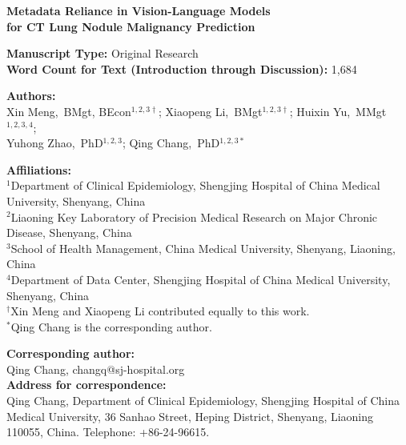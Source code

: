 \documentclass[11pt]{article}
\begin{document}
\doublespacing

\begin{center}
{\LARGE\bfseries Metadata Reliance in Vision-Language Models\\
for CT Lung Nodule Malignancy Prediction\par}
\end{center}
\vspace{0.75em}

\noindent\textbf{Manuscript Type:} Original Research\\
\textbf{Word Count for Text (Introduction through Discussion):} 1,684

\vspace{0.75em}

\noindent\textbf{Authors:}\\
Xin Meng,~BMgt, BEcon$^{1,2,3\dagger}$;
Xiaopeng Li,~BMgt$^{1,2,3\dagger}$;
Huixin Yu,~MMgt$^{1,2,3,4}$;\\
Yuhong Zhao,~PhD$^{1,2,3}$;
Qing Chang,~PhD$^{1,2,3*}$

\vspace{1em}
\noindent\textbf{Affiliations:}\\
$^1$Department of Clinical Epidemiology, Shengjing Hospital of China Medical University, Shenyang, China\\
$^2$Liaoning Key Laboratory of Precision Medical Research on Major Chronic Disease, Shenyang, China\\
$^3$School of Health Management, China Medical University, Shenyang, Liaoning, China\\
$^4$Department of Data Center, Shengjing Hospital of China Medical University, Shenyang, China\\[0.5em]
$^\dagger$Xin Meng and Xiaopeng Li contributed equally to this work.\\
$^*$Qing Chang is the corresponding author.

\vspace{1em}
\noindent\textbf{Corresponding author:}\\
Qing Chang, changq@sj-hospital.org\\[0.4em]
\noindent\textbf{Address for correspondence:}\\
Qing Chang, Department of Clinical Epidemiology, Shengjing Hospital of China Medical University, 36 Sanhao Street, Heping District, Shenyang, Liaoning 110055, China. Telephone: +86-24-96615.
\end{document}
